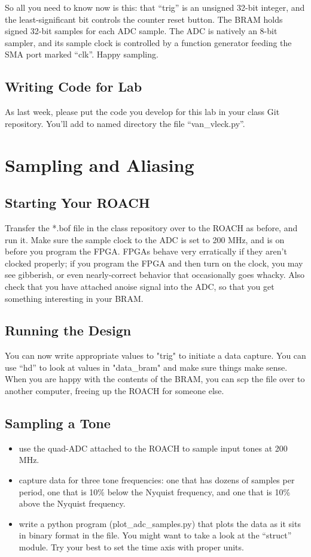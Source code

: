\documentclass[11pt]{article}
\begin{document}
So all you need to know now is this: that ``trig'' is an unsigned 32-bit integer, and the least-significant bit
controls the counter reset button.  The BRAM holds signed 32-bit samples for each ADC sample.  The
ADC is natively an 8-bit sampler, and its sample clock is controlled by a function generator feeding the
SMA port marked ``clk''.  Happy sampling.

\subsection*{Writing Code for Lab}

As last week, please put the code you develop for this lab
in your class Git repository.  You'll add to named directory the file ``van\_vleck.py''.

\section{Sampling and Aliasing}

\subsection{Starting Your ROACH}

Transfer the *.bof file in the class repository over to the ROACH as before,
and run it.  Make sure the sample clock to the ADC is set to 200 MHz, and is
on before you program the FPGA.  FPGAs behave very erratically if they aren't
clocked properly; if you program the FPGA and then turn on the clock, you may
see gibberish, or even nearly-correct behavior that occasionally goes whacky.
Also check that you have attached anoise signal into the ADC, so that you get
something interesting in your BRAM.  

\subsection{Running the Design}

You can now write appropriate values to "trig" to initiate a data capture.  You
can use ``hd'' to look at values in "data\_bram" and make sure things make sense.
When you are happy with the contents of the BRAM, you can scp the file over to
another computer, freeing up the ROACH for someone else.

\subsection{Sampling a Tone}
\begin{itemize}
\item use the quad-ADC attached to the ROACH to sample input tones at 200 MHz.
\item capture data for three tone
frequencies: one that has dozens of samples per period, one that is 10\% below the Nyquist frequency,
and one that is 10\% above the Nyquist frequency.
\item write a python program (plot\_adc\_samples.py) that plots the data as it sits in binary format
in the file.  You might want to take a look at the ``struct'' module.  Try your best to set the time
axis with proper units.
\end{itemize}
\end{document}
